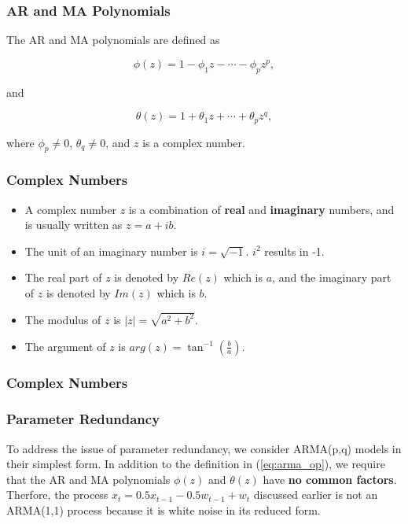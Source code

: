 \documentclass[%
xcolor=pdftex]{beamer}
\begin{document}
\begin{frame}
\frametitle{AR and MA Polynomials}

The AR and MA polynomials are defined as

\begin{equation} \label{eq:ar_poly}
\phi(z) = 1 - \phi_1 z - \cdots - \phi_p z^p,
\end{equation}

and

\begin{equation} \label{eq:ma_poly}
\theta(z) = 1 + \theta_1 z + \cdots + \theta_p z^q,
\end{equation}

where $\phi_p \neq 0$, $\theta_q \neq 0$, and $z$ is a complex number.

\end{frame}

\begin{frame}
\frametitle{Complex Numbers}

\begin{itemize}

\item A complex number $z$ is a combination of \textbf{real} and \textbf{imaginary} numbers, and is usually written as $z = a + ib$.

\item The unit of an imaginary number is $i = \sqrt{-1}$. $i^2$ results in -1.

\item The real part of $z$ is denoted by $Re(z)$ which is $a$, and the imaginary part of $z$ is denoted by $Im(z)$ which is $b$.

\item The modulus of $z$ is $|z| = \sqrt{a^2 + b^2}$.

\item The argument of $z$ is $arg(z) = \tan^{-1} (\frac{b}{a})$.

\end{itemize}



\end{frame}


\begin{frame}
\frametitle{Complex Numbers}








\end{frame}

\begin{frame}
\frametitle{Parameter Redundancy}

To address the issue of parameter redundancy, we consider ARMA(p,q) models in their simplest form. In addition to the definition in (\ref{eq:arma_op}), we require that the AR and MA polynomials $\phi(z)$ and $\theta(z)$ have \textbf{no common factors}. \\
\vspace{5mm}
Therfore, the process $x_t=0.5 x_{t-1}-0.5 w_{t-1}+w_t$ discussed earlier is not an ARMA(1,1) process because it is white noise in its reduced form.

\end{frame}
\end{document}
